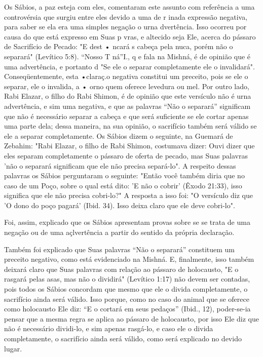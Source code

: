 Os Sábios, a paz esteja com eles, comentaram este assunto com
refe­rência a uma controvérsia que surgiu entre eles devido a uma de r
inada ex­pressão negativa, para saber se ela era uma simples negação o
urna dvertên­cia. Isso ocorreu por causa do que está expresso em Suas p
vras, e altecido seja Ele, acerca do pássaro de Sacrifício de Pecado: "E
dest • ncará s cabeça pela nuca, porém não o separará" (Levítico 5:8).
``Nosso T ná''I., q e fala na Mishná, é de opinião que é
uma advertência, e portanto d "Se ele o separar completamente ele o
invalidará". Conseqüentemente, esta •claraç.o negativa
constitui um preceito, pois se ele o separar, ele o invalida, a • orno
quem oferece levedura ou mel. Por outro lado, Rabi Elazar, o filho do
Rabi Shimon, é de opinião que este versículo não é urna advertência, e
sim uma negativa, e que as palavras ``Não o separará'' significam que não
é necessário separar a ca­beça e que será suficiente se ele cortar
apenas uma parte dela; dessa maneira, na sua opinião, o sacrifício
também será válido se ele a separar completamente. Os Sábios dizem o
seguinte, na Guemará de Zebahim: "Rabi Elazar, o filho de Rabi Shimon,
costumava dizer: Ouvi dizer que eles separam completamente o pássaro de
oferta de pecado, mas Suas palavras 'não o separará significam que ele
não precisa separá-lo". A respeito dessas palavras os Sábios perguntaram
o seguinte: "Então você também diria que no caso de um Poço, sobre o
qual está dito: 'E não o cobrir' (Êxodo 21:33), isso significa que ele não precisa
cobri-lo?" A resposta a isso foi: "O versículo diz que 'O dono do poço
pagará' (Ibid. 34). Isso deixa claro que ele deve cobri-lo".

Foi, assim, explicado que os Sábios apresentam provas sobre se se trata
de uma negação ou de uma açlvertência a partir do sentido da própria
declaração.

Também foi explicado que Suas palavras ``Não o separará'' consti­tuem um
preceito negativo, como está evidenciado na Mishná. E, finalmente, isso
também deixará claro que Suas palavras com relação ao pássaro de
holo­causto, "E o rasgará pelas asas, mas não o dividirá" (Levítico
1:17) não devem ser contadas, pois todos os Sábios concordam que mesmo
que ele o divida com­pletamente, o sacrifício ainda será válido. Isso
porque, como no caso do ani­mal que se oferece como holocausto Ele diz:
``E o cortará em seus pedaços'' (Ibid., 12), poder-se-ia pensar que a
mesma regra se aplica ao pássaro de holo­causto, por isso Ele diz que
não é necessário dividi-lo, e sim apenas rasgá-lo, e caso ele o divida
completamente, o sacrifício ainda será válido, como será explicado no
devido lugar.


